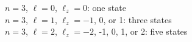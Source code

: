 $n=3$, $\ell=0$, $\ell_z=0$: one state\\
$n=3$, $\ell=1$, $\ell_z=-1$, 0, or 1: three states\\
$n=3$, $\ell=2$, $\ell_z=-2$, -1, 0, 1, or 2: five states



